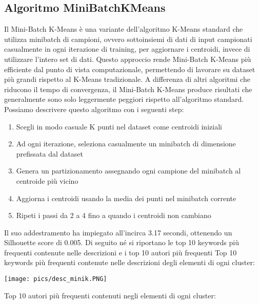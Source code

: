 \documentclass[12pt,oneside]{article}
\begin{document}
    \begin{enumerate}
    \subsection{Algoritmo MiniBatchKMeans}
    \begin{justify}
    Il Mini-Batch K-Means è una variante dell'algoritmo K-Means standard che utilizza minibatch di campioni, ovvero sottoinsiemi di dati di input campionati casualmente in ogni iterazione di training, per aggiornare i centroidi, invece di utilizzare l'intero set di dati. Questo approccio rende Mini-Batch K-Means più efficiente dal punto di vista computazionale, permettendo di lavorare su dataset più grandi rispetto al K-Means tradizionale. A differenza di altri algoritmi che riducono il tempo di convergenza, il Mini-Batch K-Means produce risultati che generalmente sono solo leggermente peggiori rispetto all’algoritmo standard. 
    Possiamo descrivere questo algoritmo con i seguenti step:

    \begin{enumerate}[label=\arabic*)]
        \item Scegli in modo casuale K punti nel dataset come centroidi iniziali
        \item Ad ogni iterazione, seleziona casualmente un minibatch di dimensione prefissata dal dataset
        \item Genera un partizionamento assegnando ogni campione del minibatch al centroide più vicino 
        \item Aggiorna i centroidi usando la media dei punti nel minibatch corrente
        \item Ripeti i passi da 2 a 4 fino a quando i centroidi non cambiano
    \end{enumerate}
    Il suo addestramento ha impiegato all’incirca 3.17 secondi, ottenendo un Silhouette score di 0.005. Di seguito né si riportano le top 10 keywords più frequenti contenute nelle descrizioni e i top 10 autori più frequenti
    Top 10 keywords più frequenti contenute nelle descrizioni degli elementi di ogni cluster:
    \end{justify}

    \texttt{[image: pics/desc\_minik.PNG]}
    
    \begin{justify}
    Top 10 autori più frequenti contenuti negli elementi di ogni cluster:
    \end{justify}


\end{enumerate}
\end{document}
